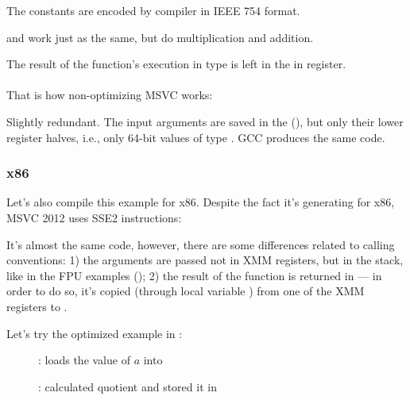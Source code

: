 The constants are encoded by compiler in IEEE 754 format.

 and  work just as the same, but do multiplication and addition.

The result of the function's execution in type \Tdouble is left in the in  register.\\
\\
That is how non-optimizing MSVC works:



Slightly redundant. 
The input arguments are saved in the  (), 
but only their lower register halves, i.e., only 64-bit values of type \Tdouble.
GCC produces the same code.

\subsubsection{x86}

Let's also compile this example for x86. Despite the fact it's generating for x86, MSVC 2012 uses SSE2 instructions:





It's almost the same code, however, there are some differences related to calling conventions:
1) the arguments are passed not in XMM registers, but in the stack, like in the FPU examples ();
2) the result of the function is returned in  --- in order to do so, it's copied
(through local variable ) from one of the XMM registers to .

\clearpage
Let's try the optimized example in \olly:

\begin{figure}[H]
\centering
{}
\caption{\olly:  loads the value of $a$ into }
\label{fig:FPU_SIMD_simple_olly1}
\end{figure}

\clearpage
\begin{figure}[H]
\centering
{}
\caption{\olly:  calculated \gls{quotient} 
and stored it in }
\label{fig:FPU_SIMD_simple_olly2}
\end{figure}

